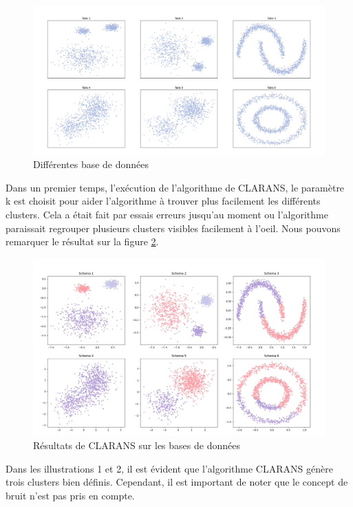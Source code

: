 \documentclass[
  oneside]{memoire-umons}
\begin{document}
\begin{figure}
\centering
\includegraphics{src/memoire-umons/images/new_versions/clusters_all.png}
\caption{Différentes base de données \label{all_schemas}}
\end{figure}

Dans un premier temps, l'exécution de l'algorithme de CLARANS, le
paramètre k est choisit pour aider l'algorithme à trouver plus
facilement les différents clusters. Cela a était fait par essais erreurs
jusqu'au moment ou l'algorithme paraissait regrouper plusieurs clusters
visibles facilement à l'oeil. Nous pouvons remarquer le résultat sur la
figure \ref{clarans_all}.

\begin{figure}
\centering
\includegraphics{src/memoire-umons/images/new_versions/clarans_all.png}
\caption{Résultats de CLARANS sur les bases de données
\label{clarans_all}}
\end{figure}

Dans les illustrations 1 et 2, il est évident que l'algorithme CLARANS
génère trois clusters bien définis. Cependant, il est important de noter
que le concept de bruit n'est pas pris en compte.
\end{document}
